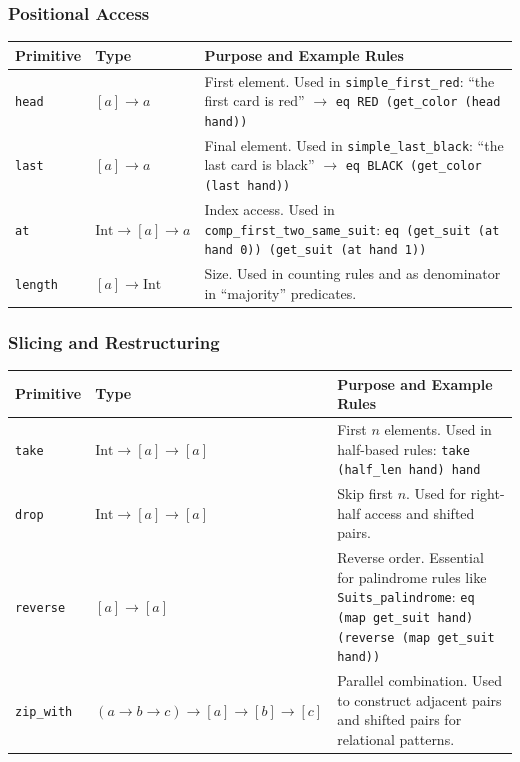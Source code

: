 \documentclass[11pt]{article}
\begin{document}
\subsubsection{Positional Access}

\begin{center}
\begin{tabular}{llp{7cm}}
\toprule
\textbf{Primitive} & \textbf{Type} & \textbf{Purpose and Example Rules} \\
\midrule
\texttt{head} & $[a] \to a$ & First element. Used in \texttt{simple\_first\_red}: ``the first card is red'' $\to$ \texttt{eq RED (get\_color (head hand))} \\
\texttt{last} & $[a] \to a$ & Final element. Used in \texttt{simple\_last\_black}: ``the last card is black'' $\to$ \texttt{eq BLACK (get\_color (last hand))} \\
\texttt{at} & $\text{Int} \to [a] \to a$ & Index access. Used in \texttt{comp\_first\_two\_same\_suit}: \texttt{eq (get\_suit (at hand 0)) (get\_suit (at hand 1))} \\
\texttt{length} & $[a] \to \text{Int}$ & Size. Used in counting rules and as denominator in ``majority'' predicates. \\
\bottomrule
\end{tabular}
\end{center}

\subsubsection{Slicing and Restructuring}

\begin{center}
\begin{tabular}{llp{7cm}}
\toprule
\textbf{Primitive} & \textbf{Type} & \textbf{Purpose and Example Rules} \\
\midrule
\texttt{take} & $\text{Int} \to [a] \to [a]$ & First $n$ elements. Used in half-based rules: \texttt{take (half\_len hand) hand} \\
\texttt{drop} & $\text{Int} \to [a] \to [a]$ & Skip first $n$. Used for right-half access and shifted pairs. \\
\texttt{reverse} & $[a] \to [a]$ & Reverse order. Essential for palindrome rules like \texttt{Suits\_palindrome}: \texttt{eq (map get\_suit hand) (reverse (map get\_suit hand))} \\
\texttt{zip\_with} & $(a \to b \to c) \to [a] \to [b] \to [c]$ & Parallel combination. Used to construct adjacent pairs and shifted pairs for relational patterns. \\
\bottomrule
\end{tabular}
\end{center}
\end{document}
